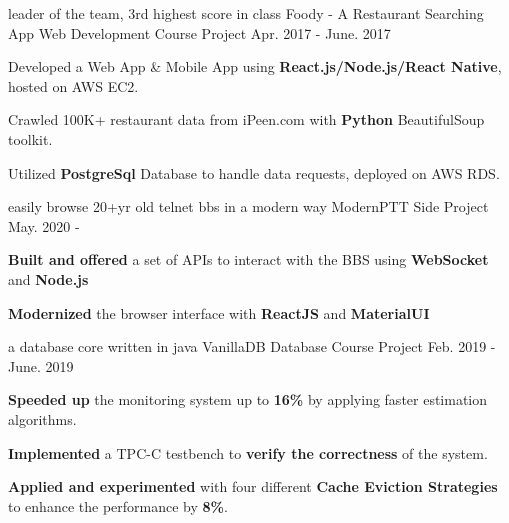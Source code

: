 


\begin{cventries}




\cventry
{leader of the team, 3rd highest score in class} %
{Foody - A Restaurant Searching App} %
{Web Development Course Project} %
{Apr. 2017 - June. 2017} %
{ %
\begin{cvitems}
 \item Developed a Web App \& Mobile App using \textbf{React.js/Node.js/React Native}, hosted on AWS EC2. 
 \item Crawled 100K+ restaurant data from iPeen.com with \textbf{Python} BeautifulSoup toolkit.
 \item Utilized \textbf{PostgreSql} Database to handle data requests, deployed on AWS RDS.
\end{cvitems}
}


\cventry
{easily browse 20+yr old telnet bbs in a modern way} %
{ModernPTT} %
{Side Project} %
{May. 2020 - } %
{ %
\begin{cvitems}
 \item \textbf{Built and offered} a set of APIs to interact with the BBS using \textbf{WebSocket} and \textbf{Node.js} 
 \item \textbf{Modernized} the browser interface with \textbf{ReactJS} and \textbf{MaterialUI}
\end{cvitems}
}

\cventry
{a database core written in java} %
{VanillaDB} %
{Database Course Project} %
{Feb. 2019 - June. 2019} %
{ %
\begin{cvitems}
\item \textbf{Speeded up} the monitoring system up to \textbf{16\%} by applying faster estimation algorithms.
\item \textbf{Implemented} a TPC-C testbench to \textbf{verify the correctness} of the system.  
\item \textbf{Applied and experimented} with four different \textbf{Cache Eviction Strategies} to enhance the performance by \textbf{8\%}.
\end{cvitems}
}


\end{cventries}
